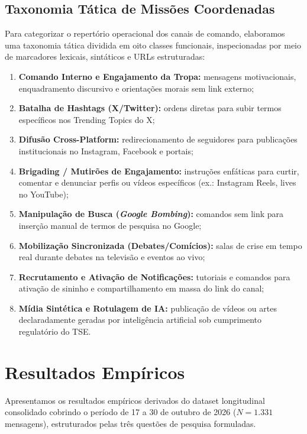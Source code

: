 \documentclass[12pt]{article}
\begin{document}
\subsection{Taxonomia Tática de Missões Coordenadas}
Para categorizar o repertório operacional dos canais de comando, elaboramos uma taxonomia tática dividida em oito classes funcionais, inspecionadas por meio de marcadores lexicais, sintáticos e URLs estruturadas:
\begin{enumerate}
    \item \textbf{Comando Interno e Engajamento da Tropa:} mensagens motivacionais, enquadramento discursivo e orientações morais sem link externo;
    \item \textbf{Batalha de Hashtags (X/Twitter):} ordens diretas para subir termos específicos nos Trending Topics do X;
    \item \textbf{Difusão Cross-Platform:} redirecionamento de seguidores para publicações institucionais no Instagram, Facebook e portais;
    \item \textbf{Brigading / Mutirões de Engajamento:} instruções enfáticas para curtir, comentar e denunciar perfis ou vídeos específicos (ex.: Instagram Reels, lives no YouTube);
    \item \textbf{Manipulação de Busca (\textit{Google Bombing}):} comandos sem link para inserção manual de termos de pesquisa no Google;
    \item \textbf{Mobilização Sincronizada (Debates/Comícios):} salas de crise em tempo real durante debates na televisão e eventos ao vivo;
    \item \textbf{Recrutamento e Ativação de Notificações:} tutoriais e comandos para ativação de sininho e compartilhamento em massa do link do canal;
    \item \textbf{Mídia Sintética e Rotulagem de IA:} publicação de vídeos ou artes declaradamente geradas por inteligência artificial sob cumprimento regulatório do TSE.
\end{enumerate}

\section{Resultados Empíricos}\label{sec:resultados}

Apresentamos os resultados empíricos derivados do dataset longitudinal consolidado cobrindo o período de 17 a 30 de outubro de 2026 ($N=1.331$ mensagens), estruturados pelas três questões de pesquisa formuladas.
\end{document}

